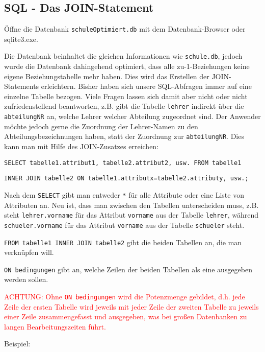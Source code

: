 \subsection[JOIN-Statement]{SQL - Das JOIN-Statement}\label{join}
Öffne die Datenbank \texttt{schuleOptimiert.db} mit dem Datenbank-Browser oder sqlite3.exe.

Die Datenbank beinhaltet die gleichen Informationen wie \texttt{schule.db}, jedoch wurde die Datenbank dahingehend optimiert, dass alle zu-1-Beziehungen keine eigene Beziehungstabelle mehr haben. Dies wird das Erstellen der JOIN-Statements erleichtern.
Bisher haben sich unsere SQL-Abfragen immer auf eine einzelne Tabelle bezogen. Viele Fragen lassen sich damit aber nicht oder nicht zufriedenstellend beantworten, z.B. gibt die Tabelle \lstinline!lehrer! indirekt über die \lstinline!abteilungNR! an, welche Lehrer welcher Abteilung zugeordnet sind. Der Anwender möchte jedoch gerne die Zuordnung der Lehrer-Namen zu den Abteilungsbezeichnungen haben, statt der Zuordnung zur \lstinline!abteilungNR!. Dies kann man mit Hilfe des JOIN-Zusatzes erreichen:
\begin{tcolorbox}[title=JOIN-Statement]
	\lstinline!SELECT tabelle1.attribut1, tabelle2.attribut2, usw. FROM tabelle1!

	\lstinline!INNER JOIN tabelle2 ON tabelle1.attributx=tabelle2.attributy, usw.;!
\end{tcolorbox}
Nach dem \lstinline!SELECT! gibt man entweder \lstinline!*! für alle Attribute oder  eine Liste von Attributen an. Neu ist, dass man zwischen den Tabellen unterscheiden muss, z.B. steht \lstinline!lehrer.vorname! für das Attribut \lstinline!vorname! aus der Tabelle \lstinline!lehrer!, während \lstinline!schueler.vorname! für das Attribut \lstinline!vorname! aus der Tabelle \lstinline!schueler! steht.

\lstinline!FROM tabelle1 INNER JOIN tabelle2! gibt die beiden Tabellen an, die man verknüpfen will.

\lstinline!ON bedingungen! gibt an, welche Zeilen der beiden Tabellen als eine ausgegeben werden sollen.

\textcolor{red}{ACHTUNG: Ohne \lstinline!ON bedingungen! wird die Potenzmenge gebildet, d.h. jede Zeile der ersten Tabelle wird jeweils mit jeder Zeile der zweiten Tabelle zu jeweils einer Zeile zusammengefasst und ausgegeben, was bei großen Datenbanken zu langen Bearbeitungszeiten führt.}

Beispiel:

